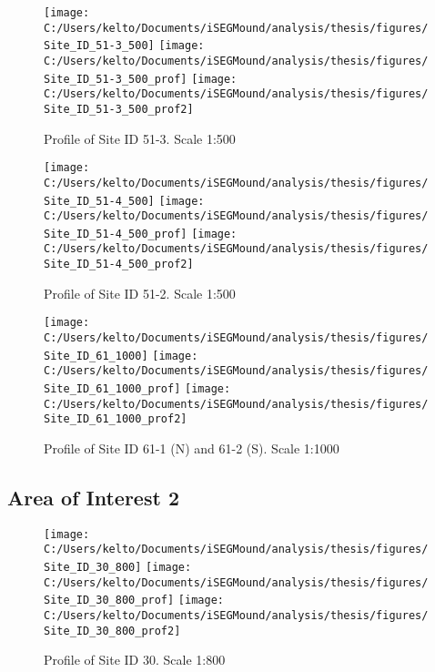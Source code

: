 \documentclass[
  12pt,
]{article}
\begin{document}
\begin{figure}
\texttt{[image: C:/Users/kelto/Documents/iSEGMound/analysis/thesis/figures/Site\_ID\_51-3\_500]} \texttt{[image: C:/Users/kelto/Documents/iSEGMound/analysis/thesis/figures/Site\_ID\_51-3\_500\_prof]} \texttt{[image: C:/Users/kelto/Documents/iSEGMound/analysis/thesis/figures/Site\_ID\_51-3\_500\_prof2]} \caption{Profile of Site ID 51-3. Scale 1:500}\label{fig:FigureAOI1-51-3}
\end{figure}

\begin{figure}
\texttt{[image: C:/Users/kelto/Documents/iSEGMound/analysis/thesis/figures/Site\_ID\_51-4\_500]} \texttt{[image: C:/Users/kelto/Documents/iSEGMound/analysis/thesis/figures/Site\_ID\_51-4\_500\_prof]} \texttt{[image: C:/Users/kelto/Documents/iSEGMound/analysis/thesis/figures/Site\_ID\_51-4\_500\_prof2]} \caption{Profile of Site ID 51-2. Scale 1:500}\label{fig:FigureAOI1-51-4}
\end{figure}

\begin{figure}
\texttt{[image: C:/Users/kelto/Documents/iSEGMound/analysis/thesis/figures/Site\_ID\_61\_1000]} \texttt{[image: C:/Users/kelto/Documents/iSEGMound/analysis/thesis/figures/Site\_ID\_61\_1000\_prof]} \texttt{[image: C:/Users/kelto/Documents/iSEGMound/analysis/thesis/figures/Site\_ID\_61\_1000\_prof2]} \caption{Profile of Site ID 61-1 (N) and 61-2 (S). Scale 1:1000}\label{fig:FigureAOI1-61}
\end{figure}

\newpage

\hypertarget{area-of-interest-2}{%
\subsection{Area of Interest 2}\label{area-of-interest-2}}

\begin{figure}
\texttt{[image: C:/Users/kelto/Documents/iSEGMound/analysis/thesis/figures/Site\_ID\_30\_800]} \texttt{[image: C:/Users/kelto/Documents/iSEGMound/analysis/thesis/figures/Site\_ID\_30\_800\_prof]} \texttt{[image: C:/Users/kelto/Documents/iSEGMound/analysis/thesis/figures/Site\_ID\_30\_800\_prof2]} \caption{Profile of Site ID 30. Scale 1:800}\label{fig:FigureAOI2-30}
\end{figure}
\end{document}
